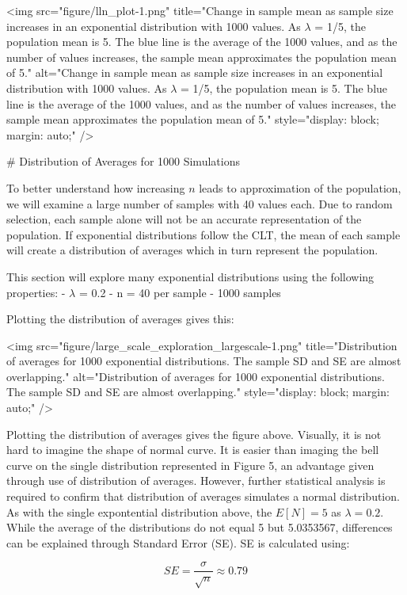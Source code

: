 <img src="figure/lln_plot-1.png" title="Change in sample mean as sample size increases in an exponential distribution with 1000 values. As $\lambda$ = 1/5, the population mean is 5. The blue line is the average of the 1000 values, and as the number of values increases, the sample mean approximates the population mean of 5." alt="Change in sample mean as sample size increases in an exponential distribution with 1000 values. As $\lambda$ = 1/5, the population mean is 5. The blue line is the average of the 1000 values, and as the number of values increases, the sample mean approximates the population mean of 5." style="display: block; margin: auto;" />

# Distribution of Averages for 1000 Simulations

To better understand how increasing \( n \) leads to approximation of the population, we will
examine a large number of samples with 40 values each.  Due to random selection, each sample alone
will not be an accurate representation of the population. If exponential distributions follow the
CLT, the mean of each sample will create a distribution of averages which in turn represent the
population.

This section will explore many exponential distributions using the following properties:
- \( \lambda \) = 0.2
- n = 40 per sample
- 1000 samples

Plotting the distribution of averages gives this:

<img src="figure/large_scale_exploration_largescale-1.png" title="Distribution of averages for 1000 exponential distributions. The sample SD and SE are almost overlapping." alt="Distribution of averages for 1000 exponential distributions. The sample SD and SE are almost overlapping." style="display: block; margin: auto;" />

Plotting the distribution of averages gives the figure above. Visually, it is not hard to imagine
the shape of normal curve. It is easier than imaging the bell curve on the single distribution
represented in Figure 5, an advantage given through use of distribution of averages. However,
further statistical analysis is required to confirm that distribution of averages simulates a normal
distribution. As with the single expontential distribution above, the \( E[N] = 5 \) as \( \lambda =
0.2 \). While the average of the distributions do not equal 5 but 5.0353567, differences can be
explained through Standard Error (SE). SE is calculated using:

\[ SE = \frac{\sigma}{\sqrt{n}} \approx 0.79 \]

